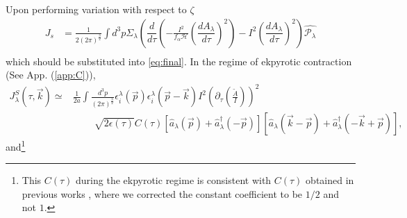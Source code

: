 \documentclass[12pt,a4paper]{article}
\numberwithin{equation}{section}
\numberwithin{equation}{section}
\begin{document}
Upon performing variation with respect to $\zeta$
\begin{equation}
\begin{split}
    J_s &= \frac{1}{2 (2\pi)^\frac{3}{2}}\int d^3p \Sigma_{\lambda}\left( \dfrac{d}{d\tau} \left(-\frac{I^2}{f_{\alpha}\mathcal{H}} \left( \dfrac{d A_{\lambda}}{d\tau} \right)^2 \right) -  I^2 \left( \dfrac{d A_{\lambda}}{d\tau} \right)^2\right)\hat{\mathcal{P_{\lambda}}}\\
    \end{split}
    \label{eq:sourcece}
\end{equation}
which should be substituted into \eqref{eq:final}.
In the regime of ekpyrotic contraction (See App. (\ref{app:C})),
\begin{equation}
 \begin{split}
J_{\lambda}^S (\tau,\Vec{k})\simeq & \frac{1}{2 a}\int \frac{d^3p}{(2\pi)^\frac{3}{2}} 
\epsilon_i^{\lambda}(\vec{p})\epsilon_i^{\lambda}(\vec{p}-\vec{k}) I^2 \left(\partial_{\tau}\left(\frac{\tilde{A}}{I}\right)\right)^2 \\
&\;\;\;\;\;\;\;\;  \sqrt{2\epsilon(\tau)} C(\tau) \left[ \hat{a}_{\lambda}(\vec{p})+\hat{a}^{\dagger}_{\lambda}(-\vec{p})\right]\left[ \hat{a}_{\lambda}(\vec{k}-\vec{p})+\hat{a}^{\dagger}_{\lambda}(-\vec{k}+\vec{p})\right],
\end{split}
\end{equation}
and\footnote{This $C(\tau)$ during the ekpyrotic regime is consistent with $C(\tau)$ obtained in previous works \cite{Artymowski:2020pci}, where we corrected the constant coefficient to be $1/2$ and not $1$.}
\end{document}
